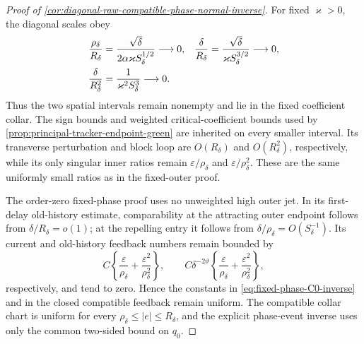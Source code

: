 \begin{proof}[Proof of
\cref{cor:diagonal-raw-compatible-phase-normal-inverse}]
For fixed \(\varkappa>0\), the diagonal scales obey
\begin{align}
 \frac{\rho_\delta}{R_\delta}
 &=\frac{\sqrt\delta}
        {2\alpha\varkappa S_\delta^{1/2}}\longrightarrow0,
 &
 \frac{\delta}{R_\delta}
 &=\frac{\sqrt\delta}
        {\varkappa S_\delta^{3/2}}\longrightarrow0,\notag\\
 \frac{\delta}{R_\delta^2}
 &=\frac1{\varkappa^2S_\delta^3}\longrightarrow0.
                                                        \label{eq:proof-diagonal-raw-scale-ratios}
\end{align}
Thus the two spatial intervals remain nonempty and lie in the fixed
coefficient collar.  The sign bounds and weighted critical-coefficient
bounds used by
\cref{prop:principal-tracker-endpoint-green} are inherited on every
smaller interval.  Its transverse perturbation and block loop are
\(O(R_\delta)\) and \(O(R_\delta^2)\), respectively, while its only
singular inner ratios remain
\(\varepsilon/\rho_\delta\) and
\(\varepsilon/\rho_\delta^2\).  These are the same uniformly small ratios
as in the fixed-outer proof.

The order-zero fixed-phase proof uses no unweighted high outer jet.  In its
first-delay old-history estimate, comparability at the attracting outer
endpoint follows from \(\delta/R_\delta=o(1)\); at the repelling entry it
follows from \(\delta/\rho_\delta=O(S_\delta^{-1})\).  Its current and
old-history feedback numbers remain bounded by
\[
 C\left\{\frac{\varepsilon}{\rho_\delta}
          +\frac{\varepsilon^2}{\rho_\delta^2}\right\},
 \qquad
 C\delta^{-2\vartheta}
 \left\{\frac{\varepsilon}{\rho_\delta}
          +\frac{\varepsilon^2}{\rho_\delta^2}\right\},
\]
respectively, and tend to zero.  Hence the constants in
\cref{eq:fixed-phase-C0-inverse} and in the closed compatible feedback
remain uniform.  The compatible collar chart is uniform for every
\(\rho_\delta\le|e|\le R_\delta\), and the explicit phase-event inverse
uses only the common two-sided bound on \(q_0\).


\end{proof}
